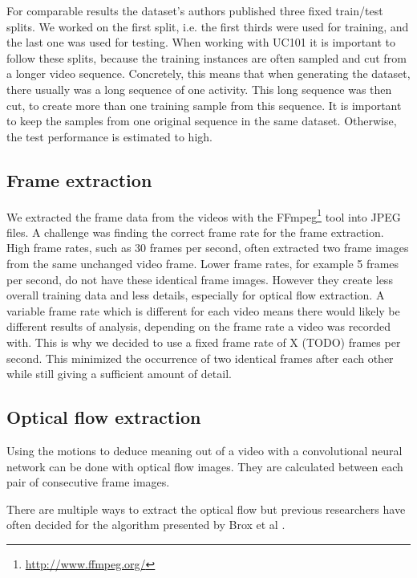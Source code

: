 For comparable results the dataset's authors published three fixed train/test splits.
We worked on the first split, i.e. the first thirds were used for training, and the last one was used for testing.
When working with UC101 it is important to follow these splits, because the training instances are often sampled and cut from a longer video sequence.
Concretely, this means that when generating the dataset, there usually was a long sequence of one activity.
This long sequence was then cut, to create more than one training sample from this sequence.
It is important to keep the samples from one original sequence in the same dataset.
Otherwise, the test performance is estimated to high.


\subsection{Frame extraction}
We extracted the frame data from the videos with the FFmpeg\footnote{\url{http://www.ffmpeg.org/}} tool into JPEG files.
A challenge was finding the correct frame rate for the frame extraction.
High frame rates, such as 30 frames per second, often extracted two frame images from the same unchanged video frame.
Lower frame rates, for example 5 frames per second, do not have these identical frame images.
However they create less overall training data and less details, especially for optical flow extraction.
A variable frame rate which is different for each video means there would likely be different results of analysis, depending on the frame rate a video was recorded with.
This is why we decided to use a fixed frame rate of X (TODO) frames per second.
This minimized the occurrence of two identical frames after each other while still giving a sufficient amount of detail.

\subsection{Optical flow extraction}
Using the motions to deduce meaning out of a video with a convolutional neural network can be done with optical flow images.
They are calculated between each pair of consecutive frame images.

There are multiple ways to extract the optical flow but previous researchers  have often decided for the algorithm presented by Brox et al
\cite{brox2004high}.



